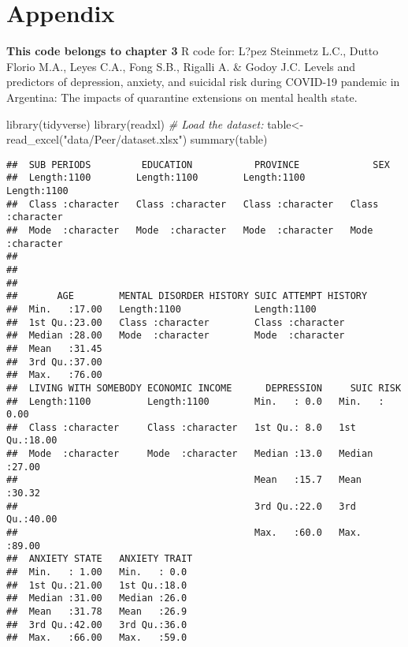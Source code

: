 \documentclass[
]{book}
\newenvironment{Shaded}{\begin{snugshade}}{\end{snugshade}}
\newcommand{\CommentTok}[1]{\textcolor[rgb]{0.56,0.35,0.01}{\textit{#1}}}
\newcommand{\FunctionTok}[1]{\textcolor[rgb]{0.00,0.00,0.00}{#1}}
\newcommand{\NormalTok}[1]{#1}
\newcommand{\OtherTok}[1]{\textcolor[rgb]{0.56,0.35,0.01}{#1}}
\newcommand{\StringTok}[1]{\textcolor[rgb]{0.31,0.60,0.02}{#1}}
\begin{document}
\hypertarget{appendix}{%
\chapter{Appendix}\label{appendix}}

\textbf{This code belongs to chapter 3}
R code for:
L?pez Steinmetz L.C., Dutto Florio M.A., Leyes C.A., Fong S.B., Rigalli A. \& Godoy J.C.
Levels and predictors of depression, anxiety, and suicidal risk during COVID-19 pandemic in Argentina: The impacts of quarantine extensions on mental health state.

\begin{Shaded}
\begin{Highlighting}[]
\FunctionTok{library}\NormalTok{(tidyverse)}
\FunctionTok{library}\NormalTok{(readxl)                            }
\CommentTok{\# Load the dataset:}
\NormalTok{table}\OtherTok{\textless{}{-}}\FunctionTok{read\_excel}\NormalTok{(}\StringTok{"data/Peer/dataset.xlsx"}\NormalTok{)}
\FunctionTok{summary}\NormalTok{(table)}
\end{Highlighting}
\end{Shaded}

\begin{verbatim}
##  SUB PERIODS         EDUCATION           PROVINCE             SEX           
##  Length:1100        Length:1100        Length:1100        Length:1100       
##  Class :character   Class :character   Class :character   Class :character  
##  Mode  :character   Mode  :character   Mode  :character   Mode  :character  
##                                                                             
##                                                                             
##                                                                             
##       AGE        MENTAL DISORDER HISTORY SUIC ATTEMPT HISTORY
##  Min.   :17.00   Length:1100             Length:1100         
##  1st Qu.:23.00   Class :character        Class :character    
##  Median :28.00   Mode  :character        Mode  :character    
##  Mean   :31.45                                               
##  3rd Qu.:37.00                                               
##  Max.   :76.00                                               
##  LIVING WITH SOMEBODY ECONOMIC INCOME      DEPRESSION     SUIC RISK    
##  Length:1100          Length:1100        Min.   : 0.0   Min.   : 0.00  
##  Class :character     Class :character   1st Qu.: 8.0   1st Qu.:18.00  
##  Mode  :character     Mode  :character   Median :13.0   Median :27.00  
##                                          Mean   :15.7   Mean   :30.32  
##                                          3rd Qu.:22.0   3rd Qu.:40.00  
##                                          Max.   :60.0   Max.   :89.00  
##  ANXIETY STATE   ANXIETY TRAIT 
##  Min.   : 1.00   Min.   : 0.0  
##  1st Qu.:21.00   1st Qu.:18.0  
##  Median :31.00   Median :26.0  
##  Mean   :31.78   Mean   :26.9  
##  3rd Qu.:42.00   3rd Qu.:36.0  
##  Max.   :66.00   Max.   :59.0
\end{verbatim}
\end{document}
